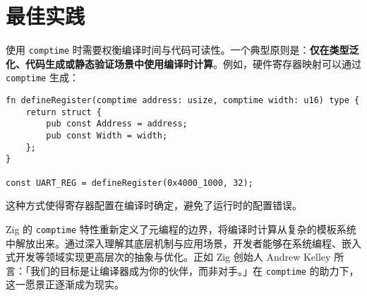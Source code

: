 \chapter{最佳实践}
使用 \verb!comptime! 时需要权衡编译时间与代码可读性。一个典型原则是：\textbf{仅在类型泛化、代码生成或静态验证场景中使用编译时计算}。例如，硬件寄存器映射可以通过 \verb!comptime! 生成：\par
\begin{lstlisting}[language=zig]
fn defineRegister(comptime address: usize, comptime width: u16) type {
    return struct {
        pub const Address = address;
        pub const Width = width;
    };
}

const UART_REG = defineRegister(0x4000_1000, 32);
\end{lstlisting}
这种方式使得寄存器配置在编译时确定，避免了运行时的配置错误。\par
Zig 的 \verb!comptime! 特性重新定义了元编程的边界，将编译时计算从复杂的模板系统中解放出来。通过深入理解其底层机制与应用场景，开发者能够在系统编程、嵌入式开发等领域实现更高层次的抽象与优化。正如 Zig 创始人 Andrew Kelley 所言：「我们的目标是让编译器成为你的伙伴，而非对手。」在 \verb!comptime! 的助力下，这一愿景正逐渐成为现实。\par
